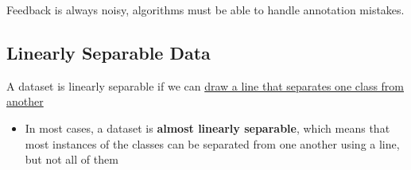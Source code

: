     Feedback is always noisy, algorithms must be able to handle annotation
    mistakes.

  \subsection{Linearly Separable Data}

    A dataset is linearly separable if we can \ul{draw a line that separates
    one class from another}

    \begin{itemize}
      \item In most cases, a dataset is \textbf{almost linearly separable},
      which means that most instances of the classes can be separated from
      one another using a line, but not all of them
    \end{itemize}
